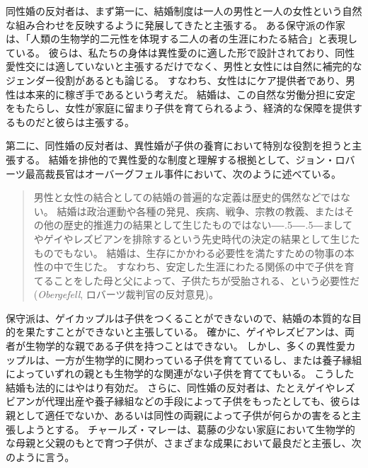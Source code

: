 \documentclass[paper=a4,book,openany]{jlreq}
\newcommand{\ig}[1]{}           %
\def\DDASH{―\kern-.5\zw―\kern-.5\zw―} %
\begin{document}
同性婚の反対者は、まず第一に、結婚制度は一人の男性と一人の女性という自然な組み合わせを反映するように発展してきたと主張する。
ある保守派の作家は、「人類の生物学的二元性を体現する二人の者の生涯にわたる結合」と表現している\citep{jensen15:_i_oppos_same_sex_marriag}。
彼らは、私たちの身体は異性愛のに適した形で設計されており、同性愛性交には適していないと主張するだけでなく、男性と女性には自然に補完的なジェンダー役割があるとも論じる。
すなわち、女性はにケア提供者であり、男性は本来的に稼ぎ手であるという考えだ。
結婚は、この自然な労働分担に安定をもたらし、女性が家庭に留まり子供を育てられるよう、経済的な保障を提供するものだと彼らは主張する。

第二に、同性婚の反対者は、異性婚が子供の養育において特別な役割を担うと主張する。
結婚を排他的で異性愛的な制度と理解する根拠として、ジョン・ロバーツ\ig{John Roberts}最高裁長官はオーバーグフェル事件において、次のように述べている。

\begin{quote}
男性と女性の結合としての結婚の普遍的な定義は歴史的偶然などではない。
結婚は政治運動や各種の発見、疾病、戦争、宗教の教義、またはその他の歴史的推進力の結果として生じたものではない{\DDASH}ましてやゲイやレズビアンを排除するという先史時代の決定の結果として生じたものでもない。
結婚は、生存にかかわる必要性を満たすための物事の本性の中で生じた。
すなわち、安定した生涯にわたる関係の中で子供を育てることをした母と父によって、子供たちが受胎される、という必要性だ(\emph{Obergefell}, ロバーツ裁判官の反対意見)\ig{John Roberts}。

\end{quote}

保守派は、ゲイカップルは子供をつくることができないので、結婚の本質的な目的を果たすことができないと主張している。
確かに、ゲイやレズビアンは、両者が生物学的な親である子供を持つことはできない。
しかし、多くの異性愛カップルは、一方が生物学的に関わっている子供を育てているし、または養子縁組によっていずれの親とも生物学的な関連がない子供を育ててもいる。
こうした結婚も法的にはやはり有効だ。
さらに、同性婚の反対者は、たとえゲイやレズビアンが代理出産や養子縁組などの手段によって子供をもったとしても、彼らは親として適任でないか、あるいは同性の両親によって子供が何らかの害をると主張しようとする。
チャールズ・マレーは、葛藤の少ない家庭において生物学的な母親と父親のもとで育つ子供が、さまざまな成果において最良だと主張し、次のように言う。
\end{document}
